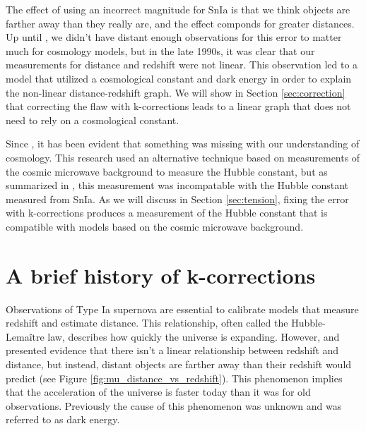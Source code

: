 \documentclass{article}
\begin{document}
The effect of using an incorrect magnitude for SnIa is that we think objects
are farther away than they really are, and the effect componds for greater
distances. Up until \citet{riess1998}, we didn't have distant enough
observations for this error to matter much for cosmology models, but in the
late 1990s, it was clear that our measurements for distance and redshift were
not linear. This observation led to a model that utilized a cosmological
constant and dark energy in order to explain the non-linear distance-redshift
graph. We will show in Section \ref{sec:correction} that correcting the flaw
with k-corrections leads to a linear graph that does not need to rely on a
cosmological constant.

Since \citet{planck2020}, it has been evident that something was missing with
our understanding of cosmology. This research used an alternative technique
based on measurements of the cosmic microwave background to measure the Hubble
constant, but as summarized in \citet{perivolaropoulos2022}, this measurement
was incompatable with the Hubble constant measured from SnIa. As we will
discuss in Section \ref{sec:tension}, fixing the error with k-corrections
produces a measurement of the Hubble constant that is compatible with models
based on the cosmic microwave background.

\section{A brief history of k-corrections}
\label{sec:history}

Observations of Type Ia supernova are essential to calibrate models that
measure redshift and estimate distance. This relationship, often called the
Hubble-Lema\^{i}tre law, describes how quickly the universe is expanding.
However, \citet{riess1998} and \citet{perlmutter1999} presented evidence that
there isn't a linear relationship between redshift and distance, but instead,
distant objects are farther away than their redshift would predict (see Figure
\ref{fig:mu_distance_vs_redshift}). This phenomenon implies that the
acceleration of the universe is faster today than it was for old observations.
Previously the cause of this phenomenon was unknown and was referred to as
dark energy.
\end{document}
